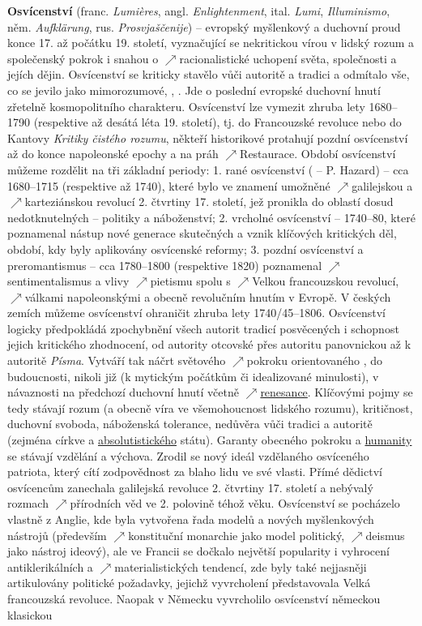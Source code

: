 \documentclass{article}
\begin{document}
  {\bf Osvícenství} (franc. {\it Lumières}, angl. {\it Enlightenment}, ital. {\it Lumi}, {\it Illuminismo}, něm. {\it Aufklärung}, rus. {\it Prosvjaščenije}) -- evropský myšlenkový a duchovní proud konce 17. až počátku 19. století, vyznačující se nekritickou vírou v lidský rozum a společenský pokrok i snahou o $\nearrow$racionalistické uchopení světa, společnosti a jejích dějin. Osvícenství se kriticky stavělo vůči autoritě a tradici a odmítalo vše, co se jevilo jako mimorozumové, , . Jde o poslední evropské duchovní hnutí zřetelně kosmopolitního charakteru. Osvícenství lze vymezit zhruba lety 1680--1790 (respektive až desátá léta 19. století), tj. do Francouzské revoluce nebo do Kantovy {\it Kritiky čistého rozumu}, někteří historikové protahují pozdní osvícenství až do konce napoleonské epochy a na práh $\nearrow$Restaurace. Období osvícenství můžeme rozdělit na tři základní periody: 1. rané osvícenství ( -- P. Hazard) -- cca 1680--1715 (respektive až 1740), které bylo ve znamení   umožněné $\nearrow$galilejskou a $\nearrow$karteziánskou revolucí 2. čtvrtiny 17. století, jež pronikla do oblastí dosud nedotknutelných -- politiky a náboženství; 2. vrcholné osvícenství -- 1740--80, které poznamenal nástup nové generace skutečných  a vznik klíčových kritických děl, období, kdy byly aplikovány osvícenské reformy; 3. pozdní osvícenství a preromantismus -- cca 1780--1800 (respektive 1820) poznamenal $\nearrow$sentimentalismus a vlivy $\nearrow$pietismu spolu s $\nearrow$Velkou francouzskou revolucí, $\nearrow$válkami napoleonskými a obecně revolučním hnutím v Evropě. V českých zemích můžeme osvícenství ohraničit zhruba lety 1740/45--1806. Osvícenství logicky předpokládá zpochybnění všech autorit tradicí posvěcených i schopnost jejich kritického zhodnocení, od autority otcovské přes autoritu panovnickou až k autoritě {\it Písma}. Vytváří tak náčrt světového $\nearrow$pokroku orientovaného , do budoucnosti, nikoli již  (k mytickým počátkům či idealizované minulosti), v návaznosti na předchozí duchovní hnutí včetně $\nearrow$\hyperref[sec:renesance]{renesance}. Klíčovými pojmy se tedy stávají rozum (a obecně víra ve všemohoucnost lidského rozumu), kritičnost, duchovní svoboda, náboženská tolerance, nedůvěra vůči tradici a autoritě (zejména církve a \hyperref[sec:absolutismus]{absolutistického} státu). Garanty obecného pokroku a \hyperref[sec:humanismus]{humanity} se stávají vzdělání a výchova. Zrodil se nový ideál vzdělaného osvíceného patriota, který cítí zodpovědnost za blaho lidu ve své vlasti. Přímé dědictví osvícencům zanechala galilejská revoluce 2. čtvrtiny 17. století a nebývalý rozmach $\nearrow$přírodních věd ve 2. polovině téhož věku. Osvícenství se pocházelo vlastně z Anglie, kde byla vytvořena řada modelů a nových myšlenkových nástrojů (především $\nearrow$konstituční monarchie jako model politický, $\nearrow$deismus jako nástroj ideový), ale ve Francii se dočkalo největší popularity i vyhrocení antiklerikálních a $\nearrow$materialistických tendencí, zde byly také nejjasněji artikulovány politické požadavky, jejichž vyvrcholení představovala Velká francouzská revoluce. Naopak v Německu vyvrcholilo osvícenství německou klasickou 
\end{document}
